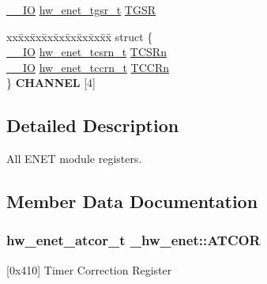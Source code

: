 \begin{DoxyCompactItemize}
\item 
\hyperlink{core__sc300_8h_aec43007d9998a0a0e01faede4133d6be}{\+\_\+\+\_\+\+IO} \hyperlink{union__hw__enet__tgsr}{hw\+\_\+enet\+\_\+tgsr\+\_\+t} \hyperlink{struct__hw__enet_a407cbcb633ea73b323fecc56f08ae948}{T\+G\+SR}
\item 
\begin{tabbing}
xx\=xx\=xx\=xx\=xx\=xx\=xx\=xx\=xx\=\kill
struct \{\\
\>\hyperlink{core__sc300_8h_aec43007d9998a0a0e01faede4133d6be}{\_\_IO} \hyperlink{union__hw__enet__tcsrn}{hw\_enet\_tcsrn\_t} \hyperlink{struct__hw__enet_a4c8d2d30c2f936260b8d36c6540e133f}{TCSRn}\\
\>\hyperlink{core__sc300_8h_aec43007d9998a0a0e01faede4133d6be}{\_\_IO} \hyperlink{union__hw__enet__tccrn}{hw\_enet\_tccrn\_t} \hyperlink{struct__hw__enet_ac8bfb1751b711fc0ec4d1278dbd5e126}{TCCRn}\\
\} {\bfseries CHANNEL} \mbox{[}4\mbox{]}\hypertarget{struct__hw__enet_a58cd8558c8dcb3dc1d90e0fde736bd10}{}\label{struct__hw__enet_a58cd8558c8dcb3dc1d90e0fde736bd10}
\\

\end{tabbing}\end{DoxyCompactItemize}


\subsection{Detailed Description}
All E\+N\+ET module registers. 

\subsection{Member Data Documentation}
\subsubsection[{\texorpdfstring{A\+T\+C\+OR}{ATCOR}}]{ {\bf hw\+\_\+enet\+\_\+atcor\+\_\+t} \+\_\+hw\+\_\+enet\+::\+A\+T\+C\+OR}\hypertarget{struct__hw__enet_ac204a963d9c7753edddb4e0d5031aefd}{}\label{struct__hw__enet_ac204a963d9c7753edddb4e0d5031aefd}
\mbox{[}0x410\mbox{]} Timer Correction Register 
